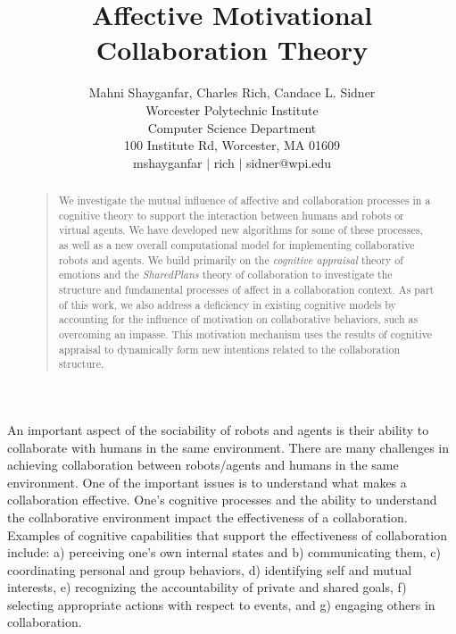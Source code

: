 \documentclass[letterpaper]{article}
\begin{document}
%
\title{Affective Motivational Collaboration Theory}
\author{Mahni Shayganfar, Charles Rich, Candace L. Sidner\\
Worcester Polytechnic Institute\\
Computer Science Department\\
100 Institute Rd, Worcester, MA 01609\\
mshayganfar $|$ rich $|$ sidner@wpi.edu\\
}
\maketitle
\begin{abstract}
\begin{quote}
We investigate the mutual influence of affective and collaboration processes in
a cognitive theory to support the interaction between humans and robots or
virtual agents. We have developed new algorithms for some of these processes, as
well as a new overall computational model for implementing collaborative robots
and agents. We build primarily on the \textit{cognitive appraisal} theory of
emotions and the \textit{SharedPlans} theory of collaboration to investigate the
structure and fundamental processes of affect in a collaboration context. As
part of this work, we also address a deficiency in existing cognitive models by
accounting for the influence of motivation on collaborative behaviors, such as
overcoming an impasse. This motivation mechanism uses the results of cognitive
appraisal to dynamically form new intentions related to the collaboration
structure.
\end{quote}
\end{abstract}

\vspace*{-1mm}
An important aspect of the sociability of robots and agents is their ability to
collaborate with humans in the same environment. There are many challenges in
achieving collaboration between robots/agents and humans in the same
environment. One of the important issues is to understand what makes a
collaboration effective. One's cognitive processes and the ability to understand
the collaborative environment impact the effectiveness of a collaboration.
Examples of cognitive capabilities that support the effectiveness of
collaboration include: a) perceiving one's own internal states and b)
communicating them, c) coordinating personal and group behaviors, d) identifying
self and mutual interests, e) recognizing the accountability of private and
shared goals, f) selecting appropriate actions with respect to events, and g)
engaging others in collaboration.
\end{document}
